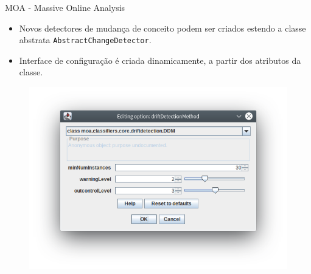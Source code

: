 \documentclass[10pt]{beamer}
\begin{document}
\begin{frame}{MOA - Massive Online Analysis}
    \begin{itemize}
        \item Novos detectores de mudança de conceito podem ser criados estendo a classe abstrata \texttt{AbstractChangeDetector}.
        \item Interface de configuração é criada dinamicamente, a partir dos atributos da classe.
    \end{itemize}

    \begin{figure}[H]
        \begin{center}
            \includegraphics[scale=0.5]{imagens/detector.png}
        \end{center}
    \end{figure}
\end{frame}
\end{document}
